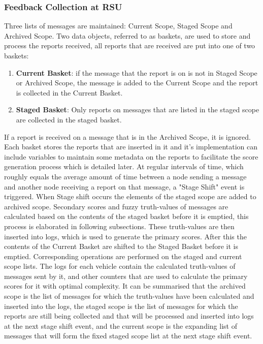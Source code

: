 \documentclass[journal]{IEEEtran}
\begin{document}
\subsubsection{Feedback Collection at RSU}
Three lists of messages are maintained: Current Scope, Staged Scope and Archived Scope.
Two data objects, referred to as baskets, are used to store and process the reports received, all reports that are received are put into one of two baskets:
\begin{enumerate}
	\item \textbf{Current Basket}: if the message that the report is on is not in Staged Scope or Archived Scope, the message is added to the Current Scope and the report is collected in the Current Basket.
	\item \textbf{Staged Basket}: Only reports on messages that are listed in the staged scope are collected in the staged basket.
\end{enumerate}
If a report is received on a message that is in the Archived Scope, it is ignored. Each basket stores the reports that are inserted in it and it's implementation can include variables to maintain some metadata on the reports to facilitate the score generation process which is detailed later. At regular intervals of time, which roughly equals the average amount of time between a node sending a message and another node receiving a report on that message, a "Stage Shift" event is triggered. When Stage shift occurs the elements of the staged scope are added to archived scope. Secondary scores and fuzzy truth-values of messages are calculated based on the contents of the staged basket before it is emptied, this process is elaborated in following subsections. These truth-values are then inserted into logs, which is used to generate the primary scores. After this the contents of the Current Basket are shifted to the Staged Basket before it is emptied. Corresponding operations are performed on the staged and current scope lists. 
The logs for each vehicle contain the calculated truth-values of messages sent by it, and other counters that are used to calculate the primary scores for it with optimal complexity.
It can be summarised that the archived scope is the list of messages for which the truth-values have been calculated and inserted into the logs, the staged scope is the list of messages for which the reports are still being collected and that will be processed and inserted into logs at the next stage shift event, and the current scope is the expanding list of messages that will form the fixed staged scope list at the next stage shift event.
\end{document}
